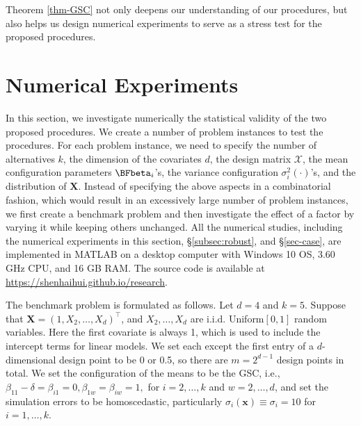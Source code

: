 \documentclass[ijoc,nonblindrev]{informs3}
\def\bx{{\bm x}}
\def\bX{{\bm X}}
\def\cX{{\mathcal X}}
\begin{document}
\begin{remark}
Theorem \ref{thm-GSC} not only deepens our understanding of our procedures, but also helps us design numerical experiments to serve as a stress test for the proposed procedures.
\end{remark}


\section{Numerical Experiments} \label{sec-numerical}

In this section, we investigate numerically the statistical validity of the two proposed procedures.
We create a number of problem instances to test the procedures.
For each problem instance, we need to specify the number of alternatives $k$, the dimension of the covariates $d$, the design matrix $\cX$, the mean configuration parameters $\BFbeta_i$'s,
the variance configuration $\sigma_i^2(\cdot)$'s, and the distribution of $\bX$.
Instead of specifying the above aspects in a combinatorial fashion, which would result in an excessively large number of problem instances,
we first create a benchmark problem and then investigate the effect of a factor by varying it while keeping others unchanged.
All the numerical studies, including the numerical experiments in  this section, \S \ref{subsec:robust}, and \S \ref{sec-case}, are implemented in MATLAB  on a desktop computer with Windows 10 OS,  3.60 GHz CPU, and 16 GB RAM.
The source code is available at \url{https://shenhaihui.github.io/research}.

The benchmark  problem is formulated as follows.
Let $d=4$ and $k=5$.
Suppose that $\bX = (1,X_2,\ldots,X_d)^\intercal$, and $X_2,\ldots,X_d$ are i.i.d. \textsf{Uniform}$[0,1]$ random variables.
Here the first covariate is always 1, which is used to include the intercept terms for linear models.
We set each except the first entry of a $d$-dimensional design point to be 0 or 0.5, so there are $m=2^{d-1}$ design points in total.
We set the configuration of the means to be the GSC, i.e., $\beta_{11} - \delta = \beta_{i1} = 0, \beta_{1w} = \beta_{iw} = 1,$ for $i=2,\ldots,k$ and $w=2,\ldots,d$,
and set the simulation errors to be homoscedastic, particularly $\sigma_i(\bx)\equiv\sigma_i = 10$ for $i=1,\ldots,k$.
\end{document}
